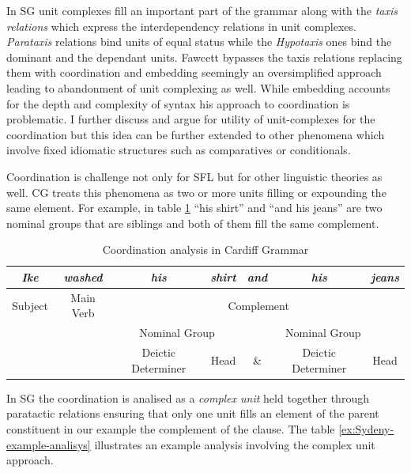 \label{sec:coordination}
In SG unit complexes fill an important part of the grammar along with the \textit{taxis relations} which express the interdependency relations in unit complexes. \textit{Parataxis} relations bind units of equal status while the \textit{Hypotaxis} ones bind the dominant and  the dependant units. Fawcett bypasses the taxis relations replacing them with coordination and embedding \citep[271]{Fawcett2000} seemingly an oversimplified approach leading to abandonment of unit complexing as well. While embedding accounts for the depth and complexity of syntax his approach to coordination is problematic. I further discuss and argue for utility of unit-complexes for the coordination but this idea can be further extended to other phenomena which involve fixed idiomatic structures such as comparatives or conditionals.

Coordination is challenge not only for SFL but for other linguistic theories as well. CG treats this phenomena as two or more units filling or expounding the same element. For example, in table \ref{ex:Cardiff-example-analisys} ``his shirt'' and ``and his jeans'' are two nominal groups that are siblings and both of them fill the same complement. 

\begin{table}[h]
	\centering
	\begin{tabular}{|c|c|c|c|c|c|c|}
		\hline
		\textit{Ike} & \textit{washed} & \textit{his} & \textit{shirt} & \textit{and} & \textit{his} & \textit{jeans} \\ \hline
		Subject         & Main Verb               & \multicolumn{5}{c|}{Complement}                                                    \\ \hline
		&                 & \multicolumn{2}{c|}{Nominal Group}      & \multicolumn{3}{c|}{Nominal Group}                     \\ \hline
		&                 & Deictic Determiner           & Head              & \&           & Deictic Determiner           & Head              \\ \hline
	\end{tabular}
	\caption{Coordination analysis in Cardiff Grammar}
	\label{ex:Cardiff-example-analisys}
\end{table}

In SG the coordination is analised as a \textit{complex unit} held together through paratactic relations ensuring that only one unit fills an element of the parent constituent in our example the complement of the clause. The table \ref{ex:Sydeny-example-analisys} illustrates an example analysis involving the complex unit approach. 

